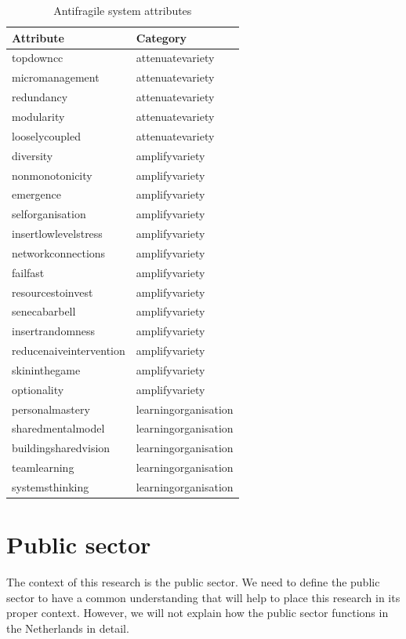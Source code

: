 \begin{longtable}{@{}p{}p{}@{}}
	\toprule%
	\textbf{Attribute} & \textbf{Category} \\%
	\midrule%
	\endhead%
	\hline
	\endfoot%
	\caption[Antifragile system attributes]{Antifragile system attributes}
	\label{tab:attributesofantifragile}
	\endlastfoot%
	\Gls{topdowncc} & \Gls{attenuatevariety} \\%
	\Gls{micromanagement} & \Gls{attenuatevariety} \\%
	\Gls{redundancy} & \Gls{attenuatevariety} \\%
	\Gls{modularity} & \Gls{attenuatevariety} \\%
	\Gls{looselycoupled} & \Gls{attenuatevariety} \\%
	\Gls{diversity} & \Gls{amplifyvariety} \\%
	\Gls{nonmonotonicity} & \Gls{amplifyvariety} \\%
	\Gls{emergence} & \Gls{amplifyvariety} \\%
	\Gls{selforganisation} & \Gls{amplifyvariety} \\%
	\Gls{insertlowlevelstress} & \Gls{amplifyvariety} \\%
	\Gls{networkconnections}  & \Gls{amplifyvariety} \\%
	\Gls{failfast} & \Gls{amplifyvariety} \\%
	\Gls{resourcestoinvest} & \Gls{amplifyvariety} \\%
	\Gls{senecabarbell} & \Gls{amplifyvariety} \\%
	\Gls{insertrandomness} & \Gls{amplifyvariety} \\%
	\Gls{reducenaiveintervention} & \Gls{amplifyvariety} \\%
	\Gls{skininthegame} & \Gls{amplifyvariety} \\%
	\Gls{optionality} &  \Gls{amplifyvariety} \\%
	\Gls{personalmastery} &  \Gls{learningorganisation} \\%
	\Gls{sharedmentalmodel} &  \Gls{learningorganisation} \\%
	\Gls{buildingsharedvision} &  \Gls{learningorganisation} \\%
	\Gls{teamlearning} &  \Gls{learningorganisation} \\%
	\Gls{systemsthinking} &  \Gls{learningorganisation} \\%
	\bottomrule%
\end{longtable}

\section{Public sector}
\label{sec:tbpublicsector}
The context of this research is the public sector. We need to define the public sector to have a common understanding that will help to place this research in its proper context. However, we will not explain how the public sector functions in the Netherlands in detail.

